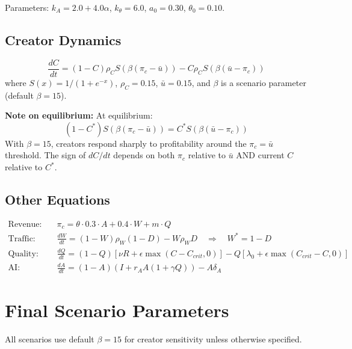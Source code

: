 \documentclass[11pt]{article}
\begin{document}
Parameters: $k_A = 2.0 + 4.0\alpha$, $k_\theta = 6.0$, $a_0 = 0.30$, $\theta_0 = 0.10$.

\subsection{Creator Dynamics}
\[
\frac{dC}{dt} = (1-C)\rho_C S(\beta(\pi_c - \bar{u})) - C\rho_C S(\beta(\bar{u} - \pi_c))
\]
where $S(x) = 1/(1+e^{-x})$, $\rho_C = 0.15$, $\bar{u} = 0.15$, and $\beta$ is a scenario parameter (default $\beta=15$).

\textbf{Note on equilibrium:} At equilibrium:
\[
(1-C^*)S(\beta(\pi_c - \bar{u})) = C^* S(\beta(\bar{u} - \pi_c))
\]
With $\beta=15$, creators respond sharply to profitability around the $\pi_c = \bar{u}$ threshold.
The sign of $dC/dt$ depends on both $\pi_c$ relative to $\bar{u}$ AND current $C$ relative to $C^*$.

\subsection{Other Equations}
\begin{align*}
\text{Revenue:} \quad & \pi_c = \theta \cdot 0.3 \cdot A + 0.4 \cdot W + m \cdot Q \\
\text{Traffic:} \quad & \frac{dW}{dt} = (1-W)\rho_W(1-D) - W\rho_W D \quad \Rightarrow \quad W^* = 1 - D \\
\text{Quality:} \quad & \frac{dQ}{dt} = (1-Q)[\nu R + \epsilon\max(C-C_{crit},0)] - Q[\lambda_0 + \epsilon\max(C_{crit}-C,0)] \\
\text{AI:} \quad & \frac{dA}{dt} = (1-A)(I + r_A A(1+\gamma Q)) - A\delta_A
\end{align*}

\section{Final Scenario Parameters}

All scenarios use default $\beta=15$ for creator sensitivity unless otherwise specified.
\end{document}
